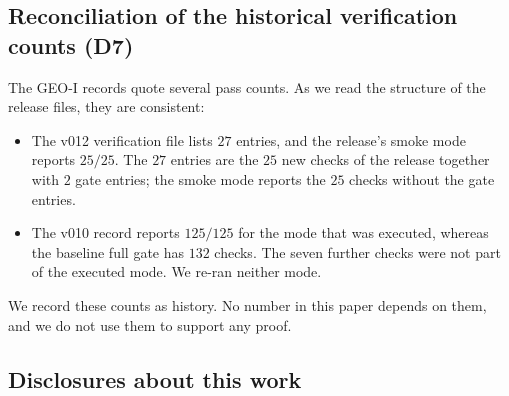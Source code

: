\subsection{Reconciliation of the historical verification counts (D7)}

The GEO-I records quote several pass counts. As we read the structure of the release files, they are consistent:

\begin{itemize}
\item The v012 verification file lists $27$ entries, and the release's smoke mode reports $25/25$. The $27$ entries are the $25$ new checks of the release together with $2$ gate entries; the smoke mode reports the $25$ checks without the gate entries.
\item The v010 record reports $125/125$ for the mode that was executed, whereas the baseline full gate has $132$ checks. The seven further checks were not part of the executed mode. We re-ran neither mode.
\end{itemize}

We record these counts as history. No number in this paper depends on them, and we do not use them to support any proof.

\subsection{Disclosures about this work}

